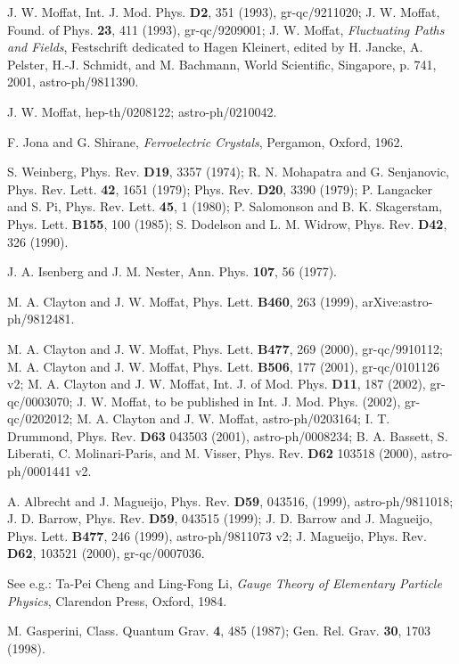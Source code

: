 \documentclass[a4paper,12pt]{article}
\begin{document}
{\begin{thebibliography}{99}
 J. W. Moffat, Int. J. Mod. Phys. {\bf D2}, 351
(1993), gr-qc/9211020; J. W. Moffat, Found. of Phys. {\bf 23}, 411 (1993),
gr-qc/9209001; J. W. Moffat, {\it Fluctuating Paths and Fields}, Festschrift
dedicated to Hagen Kleinert, edited by H. Jancke, A. Pelster, H.-J. Schmidt, and M.
Bachmann, World Scientific, Singapore, p. 741, 2001, astro-ph/9811390.

 J. W. Moffat, hep-th/0208122; astro-ph/0210042.

 F. Jona and G. Shirane, {\it Ferroelectric Crystals},
Pergamon, Oxford, 1962.

 S. Weinberg, Phys. Rev. {\bf D19}, 3357 (1974); R. N.
Mohapatra and G. Senjanovic, Phys. Rev. Lett. {\bf 42}, 1651 (1979); Phys.
Rev. {\bf D20}, 3390 (1979); P. Langacker and S. Pi, Phys. Rev. Lett. {\bf
45}, 1 (1980); P. Salomonson and B. K. Skagerstam, Phys. Lett. {\bf B155},
100 (1985); S. Dodelson and L. M. Widrow, Phys. Rev. {\bf D42}, 326 (1990).

 J. A. Isenberg and J. M. Nester, Ann. Phys.
{\bf 107}, 56 (1977).

 M. A. Clayton and J. W. Moffat, Phys.
Lett. {\bf B460}, 263 (1999), arXive:astro-ph/9812481.

 M. A. Clayton and J. W. Moffat, Phys. Lett.
{\bf B477}, 269 (2000), gr-qc/9910112; M. A. Clayton and
J. W. Moffat, Phys. Lett. {\bf B506}, 177 (2001),
gr-qc/0101126 v2; M. A. Clayton and J. W. Moffat, Int. J.
of Mod. Phys. {\bf D11}, 187 (2002), gr-qc/0003070; J. W.
Moffat, to be published in Int. J. Mod. Phys. (2002),
gr-qc/0202012; M. A. Clayton and J. W. Moffat,
astro-ph/0203164; I. T. Drummond, Phys. Rev. {\bf D63} 043503
(2001), astro-ph/0008234; B. A. Bassett, S. Liberati, C.
Molinari-Paris, and M. Visser, Phys. Rev. {\bf D62} 103518
(2000), astro-ph/0001441 v2.

 A.
Albrecht and J. Magueijo, Phys. Rev. {\bf D59}, 043516, (1999),
astro-ph/9811018; J. D. Barrow, Phys. Rev. {\bf D59},
043515 (1999); J. D. Barrow and J. Magueijo, Phys. Lett. {\bf
B477}, 246 (1999), astro-ph/9811073 v2; J. Magueijo,
Phys. Rev. {\bf D62}, 103521 (2000), gr-qc/0007036.

 See e.g.: Ta-Pei Cheng and Ling-Fong Li, {\it Gauge Theory
of Elementary Particle Physics}, Clarendon Press, Oxford, 1984.

 M. Gasperini, Class. Quantum Grav. {\bf 4}, 485 (1987); Gen. Rel.
Grav. {\bf 30}, 1703 (1998).


\end{thebibliography}}
\end{document}
